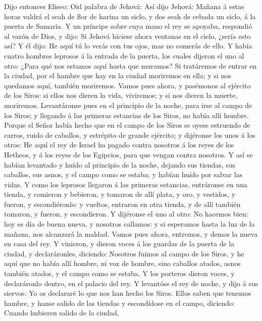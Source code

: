  Dijo entonces Eliseo: Oid palabra de Jehová: Así dijo
Jehová: Mañana á estas horas valdrá el seah de flor de harina un siclo,
y dos seah de cebada un siclo, á la puerta de Samaria.  Y un
príncipe sobre cuya mano el rey se apoyaba, respondió al varón de Dios,
y dijo: Si Jehová hiciese ahora ventanas en el cielo, ¿sería esto así? Y
él dijo: He aquí tú lo verás con tus ojos, mas no comerás de ello.
 Y había cuatro hombres leprosos á la entrada de la puerta,
los cuales dijeron el uno al otro: ¿Para qué nos estamos aquí hasta que
muramos?  Si tratáremos de entrar en la ciudad, por el
hambre que hay en la ciudad moriremos en ella; y si nos quedamos aquí,
también moriremos. Vamos pues ahora, y pasémonos al ejército de los
Siros: si ellos nos dieren la vida, viviremos; y si nos dieren la
muerte, moriremos.  Levantáronse pues en el principio de la
noche, para irse al campo de los Siros; y llegando á las primeras
estancias de los Siros, no había allí hombre.  Porque el
Señor había hecho que en el campo de los Siros se oyese estruendo de
carros, ruido de caballos, y estrépito de grande ejército; y dijéronse
los unos á los otros: He aquí el rey de Israel ha pagado contra nosotros
á los reyes de los Hetheos, y á los reyes de los Egipcios, para que
vengan contra nosotros.  Y así se habían levantado y huído
al principio de la noche, dejando sus tiendas, sus caballos, sus asnos,
y el campo como se estaba; y habían huído por salvar las vidas.
 Y como los leprosos llegaron á las primeras estancias,
entráronse en una tienda, y comieron y bebieron, y tomaron de allí
plata, y oro, y vestidos, y fueron, y escondiéronlo: y vueltos, entraron
en otra tienda, y de allí también tomaron, y fueron, y escondieron.
 Y dijéronse el uno al otro: No hacemos bien: hoy es día de
buena nueva, y nosotros callamos: y si esperamos hasta la luz de la
mañana, nos alcanzará la maldad. Vamos pues ahora, entremos, y demos la
nueva en casa del rey.  Y vinieron, y dieron voces á los
guardas de la puerta de la ciudad, y declaráronles, diciendo: Nosotros
fuimos al campo de los Siros, y he aquí que no había allí hombre, ni voz
de hombre, sino caballos atados, asnos también atados, y el campo como
se estaba.  Y los porteros dieron voces, y declaráronlo
dentro, en el palacio del rey.  Y levantóse el rey de
noche, y dijo á sus siervos: Yo os declararé lo que nos han hecho los
Siros. Ellos saben que tenemos hambre, y hanse salido de las tiendas y
escondídose en el campo, diciendo: Cuando hubieren salido de la ciudad,
